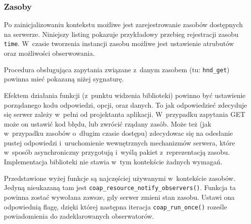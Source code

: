\vspace{0.5cm}

\vspace{0.5cm}



\subsubsection{Zasoby}

Po zainicjalizowaniu kontekstu możliwe jest zarejestrowanie zasobów dostępnych na serwerze. Niniejszy listing pokazuje przykładowy przebieg rejestracji zasobu \verb|time|. W~czasie tworzenia instancji zasobu możliwe jest ustawienie atrubutów oraz możliwości obserwowania.

\vspace{0.5cm}

\vspace{0.5cm}

Procedura obsługująca zapytania związane z~danym zasobem (tu: \verb|hnd_get|) powinna mieć pokazaną niżej sygnaturę.

\vspace{0.5cm}

\vspace{0.5cm}

Efektem działania funkcji (z~punktu widzenia biblioteki) powinno być ustawienie porządanego kodu odpowiedzi, opcji, oraz danych. To jak odpowiedzieć zdecyduje się serwer zależy w~pełni od projektanta aplikacji. W~przypadku zapytania GET może on ustawić kod błędu, lub zwrócić rządany zasób. Może też (jak w~przypadku zasobów o~długim czasie dostępu) zdecydowac się na odesłanie pustej odpowiedzi i~uruchomienie wewnętrznych mechanizmów serwera, które w~sposób asynchroniczny przygotują i~wyślą pakiet z~reprezentacją zasobu. Implementacja biblioteki nie stawia w~tym kontekście żadnych wymagań.

Przedstawione wyżej funkcje są najczęściej używanymi w~kontekście zasobów. Jedyną nieukazaną tam jest \verb|coap_resource_notify_observers()|. Funkcja ta powinna zostać wywołana zawsze, gdy serwer zmieni stan zasobu. Ustawi ona odpowiednią flagę, dzięki której następna iteracja \verb|coap_run_once()| roześle powiadomienia do zadeklarowanych obserwatorów.


